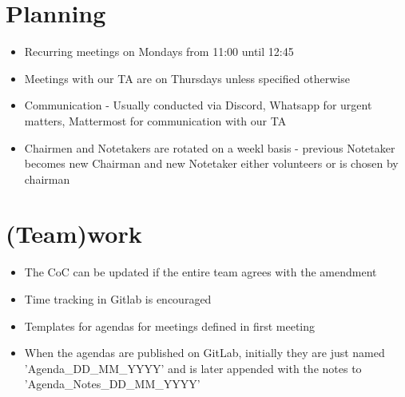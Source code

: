 \documentclass{article}
\begin{document}
\section{Planning}
    \begin{itemize}
        \item Recurring meetings on Mondays from 11:00 until 12:45
        \item Meetings with our TA are on Thursdays unless specified otherwise
        \item Communication - Usually conducted via Discord, Whatsapp for urgent matters, Mattermost for communication with our TA
        \item Chairmen and Notetakers are rotated on a weekl basis - previous Notetaker becomes new Chairman and new Notetaker either volunteers or is chosen by chairman
    \end{itemize}
\section{(Team)work}
    \begin{itemize}
        \item The CoC can be updated if the entire team agrees with the amendment
        \item Time tracking in Gitlab is encouraged
        \item Templates for agendas for meetings defined in first meeting
        \item When the agendas are published on GitLab, initially they are just named 'Agenda\_DD\_MM\_YYYY' and is later appended with the notes to \newline 'Agenda\_Notes\_DD\_MM\_YYYY'
    \end{itemize}
\end{document}
